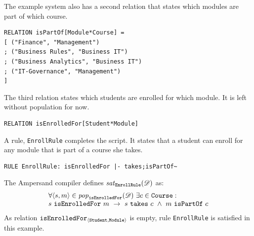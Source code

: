 \documentclass[runningheads]{llncs}
\newcommand{\id}[1]{\text{\it #1\/}}
\newcommand{\popF}[1]{\id{pop}_{#1}}
\newcommand{\pop}[2]{\popF{#1}(#2)}
\newcommand{\sat}[2]{\id{sat}_{#1}(#2)}
\newcommand{\declare}[3]{\id{#1}_{\pair{#2}{#3}}}
\newcommand{\pair}[2]{\langle{#1},{#2}\rangle}
\newcommand{\dataset}{\mathscr{D}}
\begin{document}
   The example system also has a second relation that states which modules are part of which course.
\begin{verbatim}
RELATION isPartOf[Module*Course] =
[ ("Finance", "Management")
; ("Business Rules", "Business IT")
; ("Business Analytics", "Business IT")
; ("IT-Governance", "Management")
]
\end{verbatim}
   The third relation states which students are enrolled for which module.
   It is left without population for now.
\begin{verbatim}
RELATION isEnrolledFor[Student*Module]
\end{verbatim}

   A rule, {\tt EnrollRule} completes the script.
   It states that a student can enroll for any module that is part of a course she takes.
\begin{verbatim}
RULE EnrollRule: isEnrolledFor |- takes;isPartOf~
\end{verbatim}
   The Ampersand compiler defines $\sat{\tt EnrollRule}{\dataset}$ as:
\begin{equation}
   \begin{array}{l}
   \forall \pair{s}{m}\in\pop{\tt isEnrolledFor}{\dataset}\ \exists c\in\text{\tt Course}:\\
   s\ \text{\tt isEnrolledFor}\ m\ \rightarrow\ s\ \text{\tt takes}\ c\ \wedge\ m\ \text{\tt isPartOf}\ c
   \end{array}
\label{eqn:example isEnrolledFor}
\end{equation}
   As relation $\declare{\tt isEnrolledFor}{\tt Student}{\tt Module}$ is empty, rule {\tt EnrollRule} is satisfied in this example.
\end{document}
